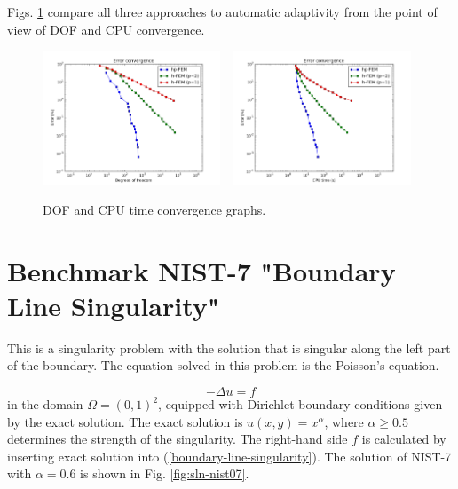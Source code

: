 \documentclass[12pt]{elsarticle}
\begin{document}

Figs. \ref{fig:nist-6-conv} compare all
three approaches to automatic adaptivity from the point
of view of DOF and CPU convergence.

\begin{figure}[!ht]
\centering
\includegraphics[height=4cm]{nist/nist-6/conv_dof_aniso.png}\ \
\includegraphics[height=4cm]{nist/nist-6/conv_cpu_aniso.png}
\caption{DOF and CPU time convergence graphs.}
\label{fig:nist-6-conv}
\end{figure}



\section{Benchmark NIST-7 "Boundary Line Singularity"}
\label{sec:bench-7}

This is a singularity problem with the solution that is singular along the left part of the boundary.
The equation solved in this problem is the Poisson's equation.

\begin{equation} \label{boundary-line-singularity}
-\Delta u = f
\end{equation}
in the domain $\Omega = (0, 1)^2$, equipped with Dirichlet boundary conditions
given by the exact solution. The exact solution is
$u(x,y) = x^{\alpha}$,
where $\alpha \geq 0.5$ determines the strength of the singularity.
The right-hand side $f$ is calculated by inserting exact solution into (\ref{boundary-line-singularity}).
The solution of NIST-7 with $\alpha = 0.6$ is shown in Fig. \ref{fig:sln-nist07}.
\end{document}
